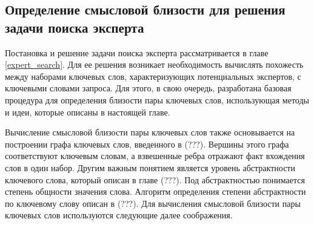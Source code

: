 \subsection{Определение смысловой близости для решения задачи поиска эксперта} \label{expert_search_wordsim}
Постановка и решение задачи поиска эксперта рассматривается в главе \ref{expert_search}. Для ее решения возникает необходимость вычислять похожесть между наборами ключевых слов, характеризующих потенциальных экспертов, с ключевыми словами запроса. Для этого, в свою очередь, разработана базовая процедура для определения близости пары ключевых слов, использующая методы и идеи, которые описаны в настоящей главе.

Вычисление смысловой близости пары ключевых слов также основывается на построении графа ключевых слов, введенного в (???). Вершины этого графа соответствуют ключевым словам, а взвешенные ребра отражают факт вхождения слов в один набор. Другим важным понятием является уровень абстрактности ключевого слова, который описан в главе (???). Под абстрактностью понимается степень общности значения слова. Алгоритм определения степени абстрактности по ключевому слову описан в (???). Для вычисления смысловой близости пары ключевых слов используются следующие далее соображения.

